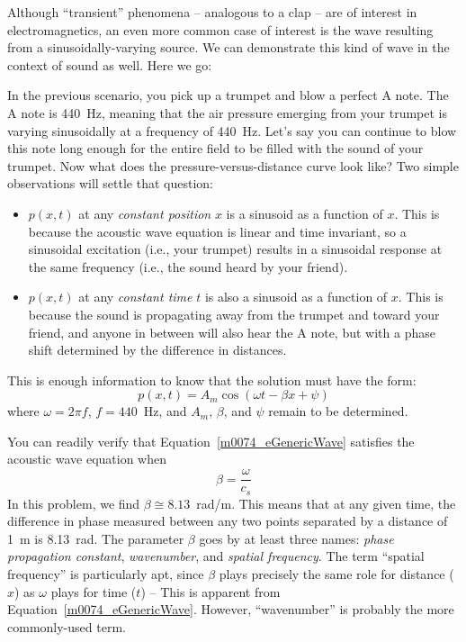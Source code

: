 Although ``transient'' phenomena -- analogous to a clap -- are of interest in electromagnetics, an even more common case of interest is the wave resulting from a sinusoidally-varying source.  We can demonstrate this kind of wave in the context of sound as well.
Here we go: 

In the previous scenario, you pick up a trumpet and blow a perfect A note.
The A note is 440~Hz, meaning that the air pressure emerging from your trumpet is varying sinusoidally at a frequency of 440~Hz.
Let's say you can continue to blow this note long enough for the entire field to be filled with the sound of your trumpet.
Now what does the pressure-versus-distance curve look like?
Two simple observations will settle that question:
%
\begin{itemize}
\item $p(x,t)$ at any \emph{constant position} $x$ is a sinusoid as a function of $x$.  
This is because the acoustic wave equation is linear and time invariant, so a sinusoidal excitation (i.e., your trumpet) results in a sinusoidal response at the same frequency (i.e., the sound heard by your friend).
\item $p(x,t)$ at any \emph{constant time} $t$ is also a sinusoid as a function of $x$.
This is because the sound is propagating away from the trumpet and toward your friend, and anyone in between will also hear the A note, but with a phase shift determined by the difference in distances.
\end{itemize}
%
This is enough information to know that the solution must have the form:
%
\begin{equation}
p(x,t) = A_m \cos\left( \omega t - \beta x + \psi \right)
\label{m0074_eGenericWave}
\end{equation} 
%
where $\omega = 2\pi f$, $f=440$~Hz, and $A_m$, $\beta$, and $\psi$ remain to be determined.

You can readily verify that Equation~\ref{m0074_eGenericWave} satisfies the acoustic wave equation when
%
\begin{equation}
\beta = \frac{\omega}{c_s}
\end{equation}
%
In this problem, we find $\beta\cong 8.13$~rad/m. 
This means that at any given time, the difference in phase measured between any two points separated by a distance of 1~m is 8.13~rad.
The parameter $\beta$ goes by at least three names: \emph{phase propagation constant}, 
\emph{wavenumber}, 
and \emph{spatial frequency}.
The term ``spatial frequency'' is particularly apt, since $\beta$ plays precisely the same role for distance ($x$) as $\omega$ plays for time ($t$) -- This is apparent from Equation~\ref{m0074_eGenericWave}.
However, ``wavenumber'' is probably the more commonly-used term.

